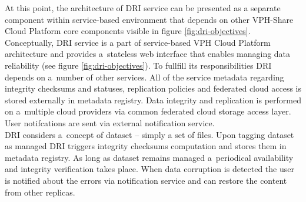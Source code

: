 At this point, the architecture of DRI service can be presented as a separate component within service-based 
environment that depends on other VPH-Share Cloud Platform core components visible in figure \ref{fig:dri-objectives}.
Conceptually, DRI service is a part of service-based VPH Cloud Platform architecture and provides
a~stateless web interface that enables managing data reliability (see figure \ref{fig:dri-objectives}).
To fullfill its responsibilities
DRI depends on a~number of other services. All of the service metadata regarding integrity checksums
and statuses, replication policies and federated cloud access is stored externally in metadata registry.
Data integrity and replication is performed on a~multiple cloud providers via common federated cloud
storage access layer. User notifcations are sent via external notification service.\\

DRI considers a~concept of dataset -- simply a set of files. Upon tagging dataset as managed DRI triggers
integrity checksums computation and stores them in metadata registry. As long as dataset remains managed
a~periodical availability and integrity verification takes place. When data corruption is detected the
user is notified about the errors via notification service and can restore the content from other replicas.


